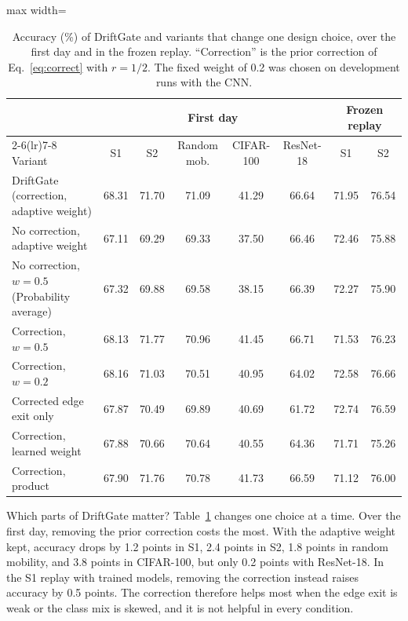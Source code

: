 \begin{table}[t]
\centering
\caption{Accuracy (\%) of DriftGate and variants that change one design choice, over the first day and in the frozen replay. ``Correction'' is the prior correction of Eq.~\eqref{eq:correct} with $r=1/2$. The fixed weight of 0.2 was chosen on development runs with the CNN.}
\label{tab:ablation}
\begin{adjustbox}{max width=\textwidth}
\begin{tabular}{lccccccc}
\toprule
 & \multicolumn{5}{c}{First day} & \multicolumn{2}{c}{Frozen replay} \\
\cmidrule(lr){2-6}\cmidrule(lr){7-8}
Variant & S1 & S2 & Random mob. & CIFAR-100 & ResNet-18 & S1 & S2 \\
\midrule
DriftGate (correction, adaptive weight) & 68.31 & 71.70 & 71.09 & 41.29 & 66.64 & 71.95 & 76.54 \\
No correction, adaptive weight & 67.11 & 69.29 & 69.33 & 37.50 & 66.46 & 72.46 & 75.88 \\
No correction, $w=0.5$ (Probability average) & 67.32 & 69.88 & 69.58 & 38.15 & 66.39 & 72.27 & 75.90 \\
Correction, $w=0.5$ & 68.13 & 71.77 & 70.96 & 41.45 & 66.71 & 71.53 & 76.23 \\
Correction, $w=0.2$ & 68.16 & 71.03 & 70.51 & 40.95 & 64.02 & 72.58 & 76.66 \\
Corrected edge exit only & 67.87 & 70.49 & 69.89 & 40.69 & 61.72 & 72.74 & 76.59 \\
Correction, learned weight & 67.88 & 70.66 & 70.64 & 40.55 & 64.36 & 71.71 & 75.26 \\
Correction, product & 67.90 & 71.76 & 70.78 & 41.73 & 66.59 & 71.12 & 76.00 \\
\bottomrule
\end{tabular}
\end{adjustbox}
\end{table}

Which parts of DriftGate matter? Table~\ref{tab:ablation} changes one choice at a time. Over the first day, removing the prior correction costs the most. With the adaptive weight kept, accuracy drops by 1.2 points in S1, 2.4 points in S2, 1.8 points in random mobility, and 3.8 points in CIFAR-100, but only 0.2 points with ResNet-18. In the S1 replay with trained models, removing the correction instead raises accuracy by 0.5 points. The correction therefore helps most when the edge exit is weak or the class mix is skewed, and it is not helpful in every condition.


